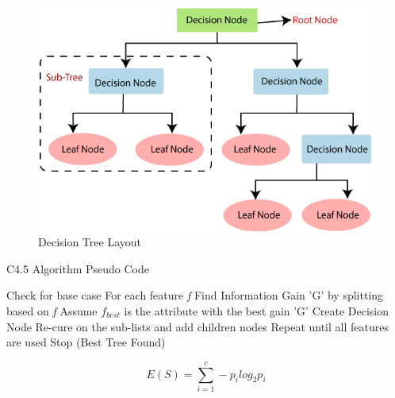 \documentclass[10pt,conference,a4paper]{IEEEtran}
\begin{document}
\begin{figure}[ht]
    \centering
    \includegraphics[width=0.9\columnwidth]{decision tree layout.png}
    \caption{Decision Tree Layout}
    \label{fig:decision_tree_layout}
\end{figure}


\begin{algorithm}
\caption{C4.5 Algorithm Pseudo Code}
\label{C.45A}
\begin{algorithmic}

    \State Check for base case
    \State For each feature \emph{f} 
    \State Find Information Gain 'G' by splitting based on \emph{f}
    \State Assume $f_{best}$ is the attribute with the best gain 'G'
        \State Create Decision Node
        \State Re-cure on the sub-lists and add children nodes
        \State Repeat until all features are used
        \Else
         \State Stop (Best Tree Found)
    \EndIf
\EndProcedure
\end{algorithmic}
\label{alg}
\end{algorithm}

\begin{equation}
    E(S) = \sum_{i=1}^{c} -p_i log_2 p_i
\end{equation}


\end{document}
